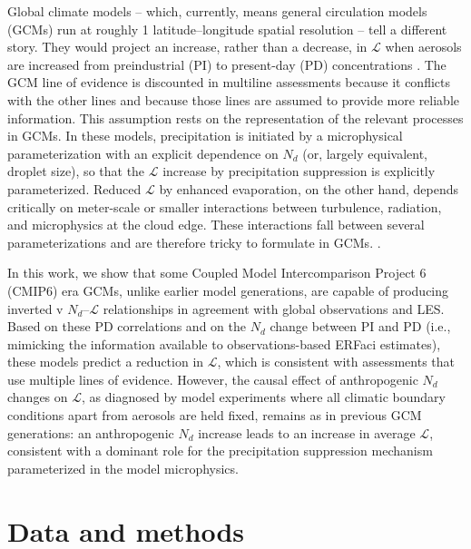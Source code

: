 \documentclass[acp, manuscript]{copernicus}\usepackage[]{graphicx}\usepackage[]{xcolor}
\newcommand\nd{\ensuremath{N_d}}
\newcommand\lwp{\ensuremath{\mathcal L}}
\begin{document}
Global climate models -- which, currently, means general circulation models
(GCMs) run at roughly 1\degree{} latitude--longitude spatial resolution -- tell
a different story.  They would project an increase, rather than a decrease,
in \lwp{} when
aerosols are increased from preindustrial (PI) to present-day (PD)
concentrations \citep{Gryspeerdt2020}.  The GCM line of evidence is
discounted in multiline assessments because it conflicts with the other lines
and because those lines are assumed to provide more reliable information.  This
assumption rests on the representation of the relevant processes in GCMs.
In these models, precipitation is initiated by a microphysical parameterization with an explicit
dependence on \nd{} (or, largely equivalent, droplet size), so that
the \lwp{} increase by precipitation suppression is explicitly parameterized.  Reduced \lwp{} by enhanced evaporation, on the other hand,
depends critically on meter-scale or smaller interactions between turbulence,
radiation, and microphysics at the cloud edge.  These interactions fall between several
parameterizations and are therefore tricky to formulate in GCMs.  \citep[As a perverse
consequence, this causes us to fret that GCMs may be structurally incapable of
representing turbulent entrainment scales, while we often mistakenly consider
the many-orders-of-magnitude-smaller-scale precipitation processes a parametric
problem; e.g.,][]{Muelmenstaedt2020,Muelmenstaedt2021}.

In this work, we show that some Coupled Model Intercomparison Project 6 (CMIP6) era GCMs, unlike earlier model
generations, are capable of producing inverted v \nd--\lwp{} relationships in
agreement with global observations and LES.  Based on these PD
correlations and on the \nd{} change between PI and PD (i.e., mimicking the
information available to observations-based ERFaci estimates), these models
predict a reduction in \lwp{}, which is consistent with assessments that use multiple lines
of evidence.  However, the causal effect of anthropogenic \nd{} changes on
\lwp{}, as diagnosed by model experiments where all climatic boundary conditions
apart from aerosols are held fixed, remains as in previous GCM generations:
an anthropogenic \nd{} increase leads to an increase in average \lwp{},
consistent with a dominant role for the precipitation suppression mechanism parameterized
in the model microphysics.  

\section{Data and methods}
\end{document}
